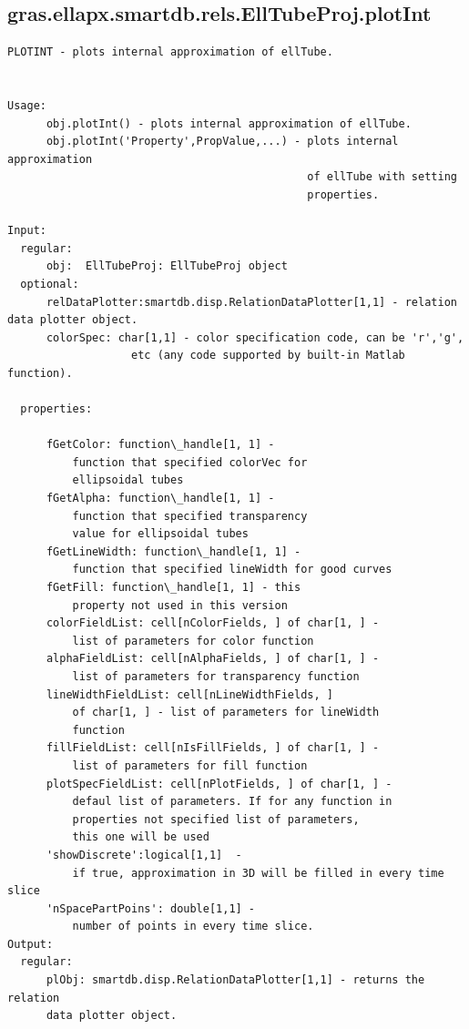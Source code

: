 \documentclass[letterpaper,10pt,english]{sphinxmanual}
\begin{document}
\subsection{gras.ellapx.smartdb.rels.EllTubeProj.plotInt}
\label{chap_functions:gras-ellapx-smartdb-rels-elltubeproj-plotint}
\begin{Verbatim}[commandchars=\\\{\}]
PLOTINT - plots internal approximation of ellTube.


Usage:
      obj.plotInt() - plots internal approximation of ellTube.
      obj.plotInt('Property',PropValue,...) - plots internal approximation
                                              of ellTube with setting
                                              properties.

Input:
  regular:
      obj:  EllTubeProj: EllTubeProj object
  optional:
      relDataPlotter:smartdb.disp.RelationDataPlotter[1,1] - relation data plotter object.
      colorSpec: char[1,1] - color specification code, can be 'r','g',
                   etc (any code supported by built-in Matlab function).

  properties:

      fGetColor: function\_handle[1, 1] -
          function that specified colorVec for
          ellipsoidal tubes
      fGetAlpha: function\_handle[1, 1] -
          function that specified transparency
          value for ellipsoidal tubes
      fGetLineWidth: function\_handle[1, 1] -
          function that specified lineWidth for good curves
      fGetFill: function\_handle[1, 1] - this
          property not used in this version
      colorFieldList: cell[nColorFields, ] of char[1, ] -
          list of parameters for color function
      alphaFieldList: cell[nAlphaFields, ] of char[1, ] -
          list of parameters for transparency function
      lineWidthFieldList: cell[nLineWidthFields, ]
          of char[1, ] - list of parameters for lineWidth
          function
      fillFieldList: cell[nIsFillFields, ] of char[1, ] -
          list of parameters for fill function
      plotSpecFieldList: cell[nPlotFields, ] of char[1, ] -
          defaul list of parameters. If for any function in
          properties not specified list of parameters,
          this one will be used
      'showDiscrete':logical[1,1]  -
          if true, approximation in 3D will be filled in every time slice
      'nSpacePartPoins': double[1,1] -
          number of points in every time slice.
Output:
  regular:
      plObj: smartdb.disp.RelationDataPlotter[1,1] - returns the relation
      data plotter object.
\end{Verbatim}
\end{document}
